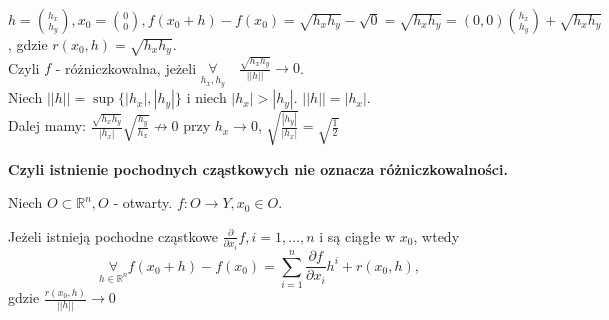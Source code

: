 \documentclass[../main.tex]{subfiles}
\begin{document}
$h=\binom{h_x}{h_y}, x_0=\binom{0}{0}, f(x_0+h)-f(x_0) = \sqrt{h_xh_y} - \sqrt{0} = \sqrt{h_xh_y} = (0,0)\binom{h_x}{h_y} + \sqrt{h_xh_y}$, gdzie $r(x_0,h) = \sqrt{h_xh_y}$.\\
Czyli $f$ - różniczkowalna, jeżeli $\underset{h_x,h_y}{\forall}\quad \frac{\sqrt{h_xh_y}}{||h||}\to0$.\\
\vspace{0.3cm}
Niech $||h|| = \sup\{|h_x|,|h_y|\}$ i niech $|h_x|>|h_y|$. $||h|| = |h_x|.$\\
Dalej mamy: $\frac{\sqrt{h_xh_y}}{|h_x|}\sqrt{\frac{h_y}{h_x}} \not\to 0 \text{ przy }h_x\to0$, $\sqrt{\frac{|h_y|}{|h_x|}}=\sqrt{\frac{1}{2}}$
\vspace{0.3cm}

\textbf{Czyli istnienie pochodnych cząstkowych nie oznacza różniczkowalności.}

\begin{tw}
Niech $O\subset\mathbb{R}^{n}, O$ - otwarty. $f: O\to Y, x_0\in O$.

Jeżeli istnieją pochodne cząstkowe $\frac{\partial}{\partial x_i} f, i=1,\dots,n$ i są ciągłe w $x_0$, wtedy
    \[
        \underset{h\in\mathbb{R}^n}{\forall} f(x_0+h)-f(x_0)=\sum_{i=1}^{n} \frac{\partial f}{\partial x_i} h^i+r(x_0,h)
    ,\]
    gdzie $\frac{r(x_0,h)}{||h||}\to0$
\end{tw}
\end{document}
